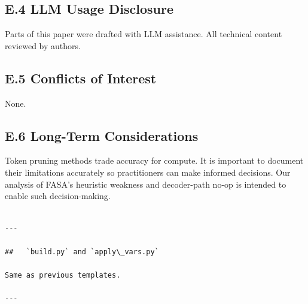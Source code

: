 \subsection{E.4 LLM Usage Disclosure}

Parts of this paper were drafted with LLM assistance. All technical content 
reviewed by authors.

\subsection{E.5 Conflicts of Interest}

None.

\subsection{E.6 Long-Term Considerations}

Token pruning methods trade accuracy for compute. It is important to 
document their limitations accurately so practitioners can make informed 
decisions. Our analysis of FASA's heuristic weakness and decoder-path 
no-op is intended to enable such decision-making.
\begin{lstlisting}

---

##   `build.py` and `apply\_vars.py`

Same as previous templates.

---
\end{lstlisting}